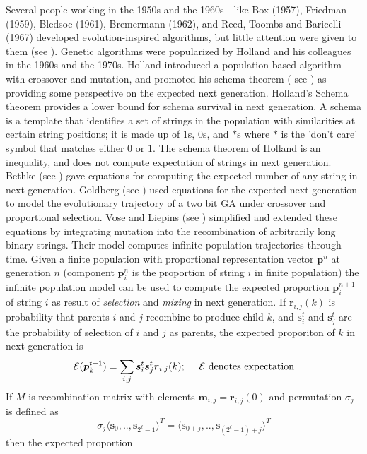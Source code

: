 Several people working in the 1950s and the 1960s - like Box (1957), Friedman (1959),
Bledsoe (1961), Bremermann (1962), and Reed, Toombs and Baricelli (1967) developed evolution-inspired algorithms, 
but little attention were given to them (see \cite{Mitchell1999}). Genetic algorithms were popularized by Holland 
and his colleagues in the 1960s and the 1970s. Holland introduced a population-based algorithm with crossover and mutation, 
and promoted his schema theorem ( see \cite{Holland1975}) as providing some perspective on the expected next generation. 
Holland's Schema theorem provides a lower bound for schema survival in 
next generation. A schema is a template that identifies a set of strings in the population with similarities 
at certain string positions; it is made up of $1$s, $0$s, and $\ast$s where 
$\ast$ is the 'don't care' symbol that matches either $0$ or $1$. The schema theorem of Holland is an inequality, 
and does not compute expectation of strings in next generation. 
Bethke (see \cite{Bethke1981}) gave equations for computing the expected number of any string in next generation. 
Goldberg (see \cite{Goldberg1987}) used equations 
for the expected next generation to model the evolutionary trajectory of a two bit GA under crossover 
and proportional selection. Vose and Liepins (see \cite{VoseLiepins1991}) simplified and extended 
these equations by integrating mutation into the recombination of arbitrarily long binary strings. 
Their model computes infinite population trajectories through time. 
Given a finite population with proportional representation vector $\bm{p}^n$ at generation $n$ 
(component $\bm{p}_i^n$ is the proportion of string $i$ in finite population) the infinite population model 
can be used to compute the expected proportion $\bm{p}_i^{n+1}$ of string $i$ as result of \textit{selection} and 
\textit{mixing} in next generation.  
If $\bm{r}_{i,j}(k)$ is probability that parents $i$ and $j$ recombine to produce child $k$, and $\bm{s}_i^t$ and $\bm{s}_j^t$ 
are the probability of selection of $i$ and $j$ as parents, the expected proporiton of $k$ in next generation is
\[
\mathcal{E}(\bm{p}_k^{t+1}) = \sum_{i,j} \bm{s}_i^t \bm{s}_j^t \bm{r}_{i,j}(k) ; \text{\hspace{10pt} $\mathcal{E}$ denotes expectation}
\]
If $M$ is recombination matrix with elements $\bm{m}_{i,j} = \bm{r}_{i,j}(0)$ and permutation $\sigma_j$ is defined as 
\[
\sigma_j{\langle \bm{s}_0,..,\bm{s}_{2^\ell - 1} \rangle}^{T} = {\langle \bm{s}_{0+j},..,\bm{s}_{(2^\ell - 1)+j} \rangle}^{T}
\]
then the expected proportion 
